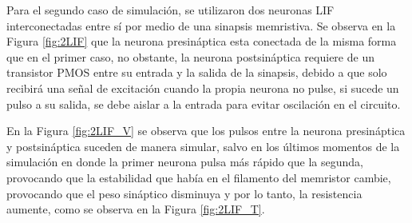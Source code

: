 \documentclass[conference]{IEEEtran}
\begin{document}
Para el segundo caso de simulación, se utilizaron dos neuronas LIF interconectadas entre sí por medio de una sinapsis memristiva. Se observa en la Figura \ref{fig:2LIF} que la neurona presináptica esta conectada de la misma forma que en el primer caso, no obstante, la neurona postsináptica requiere de un transistor PMOS entre su entrada y la salida de la sinapsis, debido a que solo recibirá una señal de excitación cuando la propia neurona no pulse, si sucede un pulso a su salida, se debe aislar a la entrada para evitar oscilación en el circuito.

En la Figura \ref{fig:2LIF_V} se observa que los pulsos entre la neurona presináptica y postsináptica suceden de manera simular, salvo en los últimos momentos de la simulación en donde la primer neurona pulsa más rápido que la segunda, provocando que la estabilidad que había en el filamento del memristor cambie, provocando que el peso sináptico disminuya y por lo tanto, la resistencia aumente, como se observa en la Figura \ref{fig:2LIF_T}.
\end{document}
